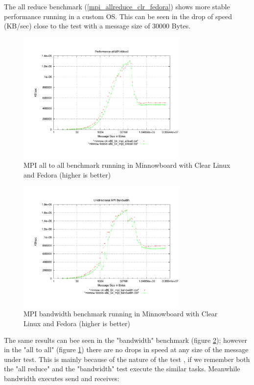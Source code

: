 The all reduce benchmark (\ref{mpi_allreduce_clr_fedora}) shows more stable
performance running in a custom OS.  This can be seen in the drop of speed
(KB/sec) close to the test with a message size of 30000 Bytes. 

\begin{figure}[H]
\centering
\includegraphics[width=0.75\textwidth]{images/mpbench_clr_experiments/mpi_alltoall.pdf}
\caption{MPI all to all benchmark running in Minnowboard with Clear Linux and
Fedora (higher is better)}
\label{mpi_alltoall_clr_fedora}
\end{figure}


\begin{figure}[H]
\centering
\includegraphics[width=0.75\textwidth]{images/mpbench_clr_experiments/mpi_bandwidth.pdf}
\caption{MPI bandwidth benchmark running in Minnowboard with Clear Linux and
Fedora (higher is better)}
\label{mpi_bandwidth_clr_fedora}
\end{figure}

The same results can bee seen in the "bandwidth" benchmark (figure
\ref{mpi_bandwidth_clr_fedora}); however in the "all to all" (figure
\ref{mpi_alltoall_clr_fedora}) there are no drops in speed at any size of the
message under test.  This is mainly because of the nature of the test , if we
remember both the "all reduce" and the "bandwidth" test execute the similar
tasks. Meanwhile bandwidth executes send and receives: 

